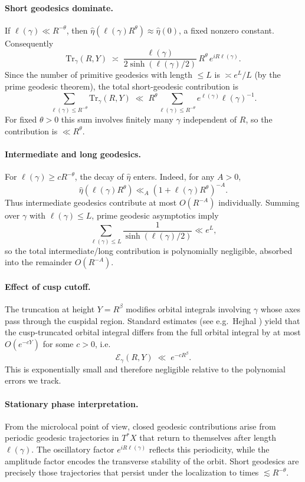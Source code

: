 \paragraph{Short geodesics dominate.}
If $\ell(\gamma)\ll R^{-\theta}$, then $\widehat{\eta}(\ell(\gamma)R^\theta)\approx \widehat{\eta}(0)$, a fixed 
nonzero constant. Consequently
\[
\mathrm{Tr}_\gamma(R,Y) \;\asymp\; \frac{\ell(\gamma)}{2\sinh(\ell(\gamma)/2)}\,R^\theta\,e^{iR\ell(\gamma)}.
\]
Since the number of primitive geodesics with length $\le L$ is $\asymp e^L/L$ (by the prime geodesic theorem), the 
total short-geodesic contribution is 
\[
\sum_{\ell(\gamma)\le R^{-\theta}} \mathrm{Tr}_\gamma(R,Y) \;\ll\; R^\theta \sum_{\ell(\gamma)\le R^{-\theta}} e^{\ell(\gamma)} \ell(\gamma)^{-1}.
\]
For fixed $\theta>0$ this sum involves finitely many $\gamma$ independent of $R$, so the contribution is $\ll R^\theta$. 

\paragraph{Intermediate and long geodesics.}
For $\ell(\gamma)\ge c R^{-\theta}$, the decay of $\widehat{\eta}$ enters. Indeed, for any $A>0$,
\[
\widehat{\eta}(\ell(\gamma)R^\theta) \ll_A (1+\ell(\gamma)R^\theta)^{-A}.
\]
Thus intermediate geodesics contribute at most $O(R^{-A})$ individually. Summing over $\gamma$ with $\ell(\gamma)\le L$, 
prime geodesic asymptotics imply
\[
\sum_{\ell(\gamma)\le L} \frac{1}{\sinh(\ell(\gamma)/2)} \ll e^L,
\]
so the total intermediate/long contribution is polynomially negligible, absorbed into the remainder $O(R^{-A})$. 

\paragraph{Effect of cusp cutoff.}
The truncation at height $Y=R^\beta$ modifies orbital integrals involving $\gamma$ whose axes pass through the cuspidal 
region. Standard estimates (see e.g.\ Hejhal \cite{hejhal1976}) yield that the cusp-truncated orbital integral differs 
from the full orbital integral by at most $O(e^{-c Y})$ for some $c>0$, i.e.\ 
\[
\mathcal{E}_\gamma(R,Y) \;\ll\; e^{-c R^\beta}.
\]
This is exponentially small and therefore negligible relative to the polynomial errors we track. 

\paragraph{Stationary phase interpretation.}
From the microlocal point of view, closed geodesic contributions arise from periodic geodesic trajectories in $T^*X$ 
that return to themselves after length $\ell(\gamma)$. The oscillatory factor $e^{iR\ell(\gamma)}$ reflects this 
periodicity, while the amplitude factor encodes the transverse stability of the orbit. Short geodesics are precisely 
those trajectories that persist under the localization to times $\lesssim R^{-\theta}$. 

